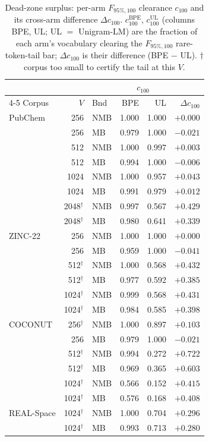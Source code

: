 \begin{table}[htbp]
  \centering
  \caption{Dead-zone surplus: per-arm $F_{95\%,100}$ clearance $c_{100}$ and its cross-arm difference $\Delta c_{100}$. $c_{100}^{\mathrm{BPE}}$, $c_{100}^{\mathrm{UL}}$ (columns BPE, UL; UL $=$ Unigram-LM) are the fraction of each arm's vocabulary clearing the $F_{95\%,100}$ rare-token-tail bar; $\Delta c_{100}$ is their difference (BPE $-$ UL). $\dagger$ corpus too small to certify the tail at this $V$.}
  \label{tab:results-delta-f}
  \footnotesize
  \begin{tabular}{@{}l r l r r r@{}}
    \toprule
    & & & \multicolumn{2}{c}{$c_{100}$} & \\
    \cmidrule(lr){4-5}
    Corpus & $V$ & Bnd & BPE & UL & $\Delta c_{100}$ \\
    \midrule
    PubChem & 256 & NMB & 1.000 & 1.000 & $+0.000$ \\
     & 256 & MB & 0.979 & 1.000 & $-0.021$ \\
     & 512 & NMB & 1.000 & 0.997 & $+0.003$ \\
     & 512 & MB & 0.994 & 1.000 & $-0.006$ \\
     & 1024 & NMB & 1.000 & 0.957 & $+0.043$ \\
     & 1024 & MB & 0.991 & 0.979 & $+0.012$ \\
     & 2048$^{\dagger}$ & NMB & 0.997 & 0.567 & $+0.429$ \\
     & 2048$^{\dagger}$ & MB & 0.980 & 0.641 & $+0.339$ \\
    \addlinespace
    ZINC-22 & 256 & NMB & 1.000 & 1.000 & $+0.000$ \\
     & 256 & MB & 0.959 & 1.000 & $-0.041$ \\
     & 512$^{\dagger}$ & NMB & 1.000 & 0.568 & $+0.432$ \\
     & 512$^{\dagger}$ & MB & 0.977 & 0.592 & $+0.385$ \\
     & 1024$^{\dagger}$ & NMB & 0.999 & 0.568 & $+0.431$ \\
     & 1024$^{\dagger}$ & MB & 0.984 & 0.585 & $+0.398$ \\
    \addlinespace
    COCONUT & 256$^{\dagger}$ & NMB & 1.000 & 0.897 & $+0.103$ \\
     & 256 & MB & 0.979 & 1.000 & $-0.021$ \\
     & 512$^{\dagger}$ & NMB & 0.994 & 0.272 & $+0.722$ \\
     & 512$^{\dagger}$ & MB & 0.969 & 0.365 & $+0.603$ \\
     & 1024$^{\dagger}$ & NMB & 0.566 & 0.152 & $+0.415$ \\
     & 1024$^{\dagger}$ & MB & 0.576 & 0.168 & $+0.408$ \\
    \addlinespace
    REAL-Space & 1024$^{\dagger}$ & NMB & 1.000 & 0.704 & $+0.296$ \\
     & 1024$^{\dagger}$ & MB & 0.993 & 0.713 & $+0.280$ \\
    \bottomrule
  \end{tabular}
\end{table}
